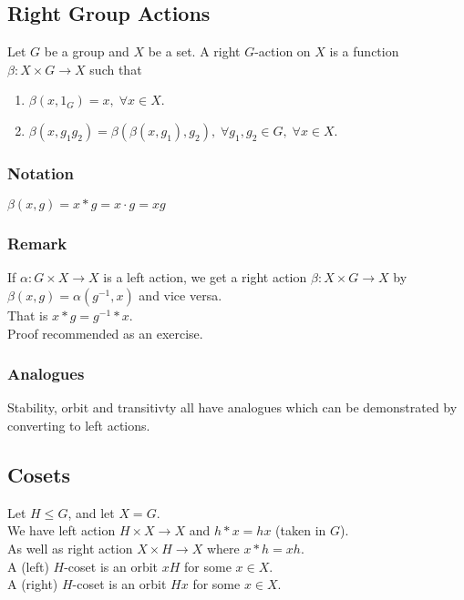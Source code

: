 \documentclass[11pt]{article}
\newcommand{\0}{\emptyset}
\begin{document}
\subsection*{Right Group Actions}
\label{sec:orgaae87df}
Let \(G\) be a group and \(X\) be a set. A right \(G\)-action on \(X\) is a function \(\beta:X\times G\to X\) such that\\[0pt]
\begin{enumerate}
\item \(\beta(x,1_{G})=x,\;\forall x\in X\).\\[0pt]
\item \(\beta(x,g_{1}g_{2})=\beta(\beta(x,g_{1}),g_{2}),\;\forall g_{1},g_{2}\in G,\;\forall x\in X\).\\[0pt]
\end{enumerate}
\subsubsection*{Notation}
\label{sec:orga8f63dd}
\(\beta(x,g)=x*g=x\cdot g=xg\)\\[0pt]
\subsubsection*{Remark}
\label{sec:org6e0967c}
If \(\alpha:G\times X\to X\) is a left action, we get a right action \(\beta:X\times G\to X\) by \(\beta(x,g)=\alpha(g^{-1},x)\) and vice versa.\\[0pt]
That is \(x*g=g^{-1}*x\).\\[0pt]
Proof recommended as an exercise.\\[0pt]
\subsubsection*{Analogues}
\label{sec:orga669bca}
Stability, orbit and transitivty all have analogues which can be demonstrated by converting to left actions.\\[0pt]
\subsection*{Cosets}
\label{sec:orgb55c7e0}
Let \(H\leq G\), and let \(X=G\).\\[0pt]
We have left action \(H\times X\to X\) and \(h*x=hx\) (taken in \(G\)).\\[0pt]
As well as right action \(X\times H\to X\) where \(x*h=xh\).\\[0pt]
A (left) \(H\)-coset is an orbit \(xH\) for some \(x\in X\).\\[0pt]
A (right) \(H\)-coset is an orbit \(Hx\) for some \(x\in X\).\\[0pt]
\end{document}
